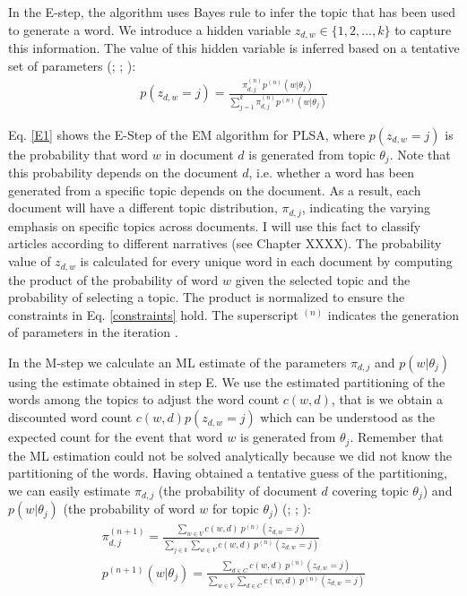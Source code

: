 \documentclass[11pt,a4paper,english,oneside]{book}
\numberwithin{equation}{chapter}
\begin{document}
In the E-step, the algorithm uses Bayes rule to infer the topic that has been used to generate a word. We introduce a hidden variable $z_{d,w} \in \{1,2,...,k\}$ to capture this information. The value of this hidden variable is inferred based on a tentative set of parameters (\citealp[p. 290]{Hofmann.1999}; \citeyear[p. 182]{Hofmann.2001}; \citealp[p. 362--374]{Zhai.2016}):
\begin{align}\label{E1}
p(z_{d,w}=j)=\frac{\pi_{d,j}^{(n)}p^{(n)}(w|\theta_j)}{\sum_{j=1}^{k}\pi_{d,j}^{(n)}p^{(n)}(w|\theta_j)}
\end{align}

Eq. \ref{E1} shows the E-Step of the EM algorithm for PLSA, where $p(z_{d,w}=j)$ is the probability that word $w$ in document $d$ is generated from topic $\theta_j$. Note that this probability depends on the document $d$, i.e. whether a word has been generated from a specific topic depends on the document. As a result, each document will have a different topic distribution, $\pi_{d,j}$, indicating the varying emphasis on specific topics across documents. I will use this fact to classify articles according to different narratives (see Chapter XXXX).  The probability value of $z_{d,w}$ is calculated for every unique word in each document by computing the product of the probability of word $w$ given the selected topic and the probability of selecting a topic. The product is normalized to ensure the constraints in Eq. \ref{constraints} hold. The superscript $^{(n)}$ indicates the generation of parameters in the iteration \citep[p. 374--376]{Zhai.2016}.  

In the M-step we calculate an ML estimate of the parameters $\pi_{d,j}$ and $p(w|\theta_j)$ using the estimate obtained in step E. We use the estimated partitioning of the words among the topics to adjust the word count $c(w,d)$, that is we obtain a discounted word count $c(w,d) p(z_{d,w}=j)$ which can be understood as the expected count for the event that word $w$ is generated from $\theta_j$. Remember that the ML estimation could not be solved analytically because we did not know the partitioning of the words. Having obtained a tentative guess of the partitioning, we can easily estimate $\pi_{d,j}$ (the probability of document $d$ covering topic $\theta_j$) and $p(w|\theta_j)$ (the probability of word $w$ for topic $\theta_j$) (\citealp[p. 290]{Hofmann.1999}; \citeyear[p. 182]{Hofmann.2001}; \citealp[p. 364--375]{Zhai.2016}):
\begin{align}%
\label{M1pi} \pi_{d,j}^{(n+1)}=\frac{\sum_{w \in V} c(w,d)\ p^{(n)}(z_{d,w}=j)}{\sum_{j \in k}\sum_{w \in V}c(w,d) \ p^{(n)}(z_{d,w}=j)}\\
\label{M1theta} p^{(n+1)}(w|\theta_j)=\frac{\sum_{d \in C} c(w,d)\ p^{(n)}(z_{d,w}=j)}{\sum_{w \in V}\sum_{d \in C}c(w,d)\ p^{(n)}(z_{d,w}=j)}
\end{align}
\end{document}
